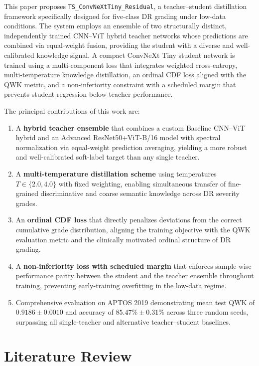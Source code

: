 \documentclass[a4paper,fleqn]{cas-dc}
\begin{document}
This paper proposes \texttt{TS\_ConvNeXtTiny\_Residual}, a teacher--student distillation framework specifically designed for five-class DR grading under low-data conditions. The system employs an ensemble of two structurally distinct, independently trained CNN--ViT hybrid teacher networks whose predictions are combined via equal-weight fusion, providing the student with a diverse and well-calibrated knowledge signal. A compact ConvNeXt Tiny \cite{liu2022} student network is trained using a multi-component loss that integrates weighted cross-entropy, multi-temperature knowledge distillation, an ordinal CDF loss aligned with the QWK metric, and a non-inferiority constraint with a scheduled margin that prevents student regression below teacher performance.

The principal contributions of this work are:

\begin{enumerate}
    \item A \textbf{hybrid teacher ensemble} that combines a custom Baseline CNN--ViT hybrid and an Advanced ResNet50+ViT-B/16 model with spectral normalization via equal-weight prediction averaging, yielding a more robust and well-calibrated soft-label target than any single teacher.
    \item A \textbf{multi-temperature distillation scheme} using temperatures $T \in \{2.0, 4.0\}$ with fixed weighting, enabling simultaneous transfer of fine-grained discriminative and coarse semantic knowledge across DR severity grades.
    \item An \textbf{ordinal CDF loss} that directly penalizes deviations from the correct cumulative grade distribution, aligning the training objective with the QWK evaluation metric and the clinically motivated ordinal structure of DR grading.
    \item A \textbf{non-inferiority loss with scheduled margin} that enforces sample-wise performance parity between the student and the teacher ensemble throughout training, preventing early-training overfitting in the low-data regime.
    \item Comprehensive evaluation on APTOS 2019 demonstrating mean test QWK of $\mathbf{0.9186 \pm 0.0010}$ and accuracy of $\mathbf{85.47\% \pm 0.31\%}$ across three random seeds, surpassing all single-teacher and alternative teacher--student baselines.
\end{enumerate}

\section{Literature Review}
\end{document}
